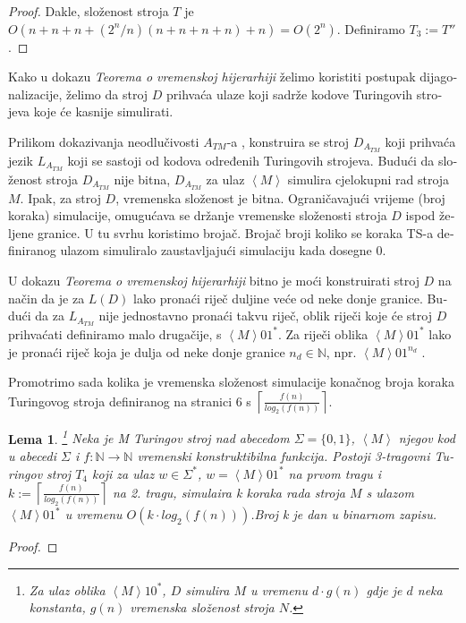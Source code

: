 \documentclass[12pt]{rectors}
\newtheorem{lemma}[theorem]{Lema}
\begin{document}
\begin{otherlanguage}{croatian}
\begin{proof}
Dakle, složenost stroja $T$ je $O(n+n+n+(2^n/n)(n+n+n+n)+n) = O(2^n)$. 
Definiramo $T_3 := T''$.

\end{proof}

Kako u dokazu \textit{Teorema o vremenskoj hijerarhiji} želimo koristiti
postupak dijagonalizacije, želimo da stroj $D$ prihvaća ulaze koji sadrže kodove Turingovih strojeva koje će kasnije simulirati.

Prilikom dokazivanja neodlučivosti $A_{TM}$-a \cite{sipser2006},
konstruira se stroj $D_{A_{TM}}$ koji prihvaća jezik $L_{A_{TM}}$ koji se sastoji od kodova
određenih Turingovih strojeva. 
Budući da složenost stroja $D_{A_{TM}}$ nije bitna,  $D_{A_{TM}}$ za ulaz $\left < M \right >$ simulira cjelokupni rad stroja $M$. Ipak, za stroj $D$, 
vremenska složenost je bitna. Ograničavajući vrijeme (broj koraka) simulacije,
omugućava se držanje vremenske složenosti stroja $D$ ispod željene granice.
U tu svrhu koristimo brojač. Brojač broji koliko se koraka TS-a definiranog ulazom simuliralo zaustavljajući simulaciju kada dosegne $0$.
 
U dokazu \textit{Teorema o vremenskoj hijerarhiji} bitno je moći konstruirati stroj $D$ na
način da je za $L(D)$ lako pronaći riječ duljine veće od neke donje granice.
Budući da za $L_{A_{TM}}$ nije jednostavno pronaći takvu riječ, oblik riječi koje će stroj $D$ prihvaćati definiramo malo drugačije, s
$\left< M \right>01^*$.
Za riječi oblika $\left< M \right>01^*$ lako je
pronaći riječ koja je dulja od neke donje granice $n_d \in \mathbb{N}$, npr. $\left< M \right>01^{n_d}$ .

Promotrimo sada kolika je vremenska složenost simulacije konačnog broja koraka Turingovog stroja definiranog na stranici 6 s $\left \lceil{\frac{ f(n)}{log_2(f(n))} }\right \rceil$.


\begin{lemma}\label{lemma:t4}\footnote{Za ulaz oblika $\left < M \right >10^*$, $D$ simulira $M$ u vremenu $d \cdot g(n)$ gdje je $d$ neka konstanta, $g(n)$ vremenska složenost stroja $N$.}
Neka je M Turingov stroj nad abecedom $\Sigma = \{0,1\}$, $\left < M \right >$ njegov kod u abecedi $\Sigma $ i $f: \mathbb{N} \to \mathbb{N}$ vremenski konstruktibilna funkcija.
Postoji 3-tragovni Turingov stroj $T_4$ koji za ulaz $w \in \Sigma^*$, $w = \left < M \right >01^*$ na prvom tragu i $k := \left \lceil{ \frac{f(n)}{log_2(f(n))} }\right \rceil $ na 2. tragu, simulaira k koraka rada stroja $M$ s ulazom $\left < M \right >01^*$ u vremenu $O(k \cdot log_2(f(n)))$.\newline Broj k je dan u binarnom zapisu.
\end{lemma}
\begin{proof}


\end{proof}
\end{otherlanguage}
\end{document}
